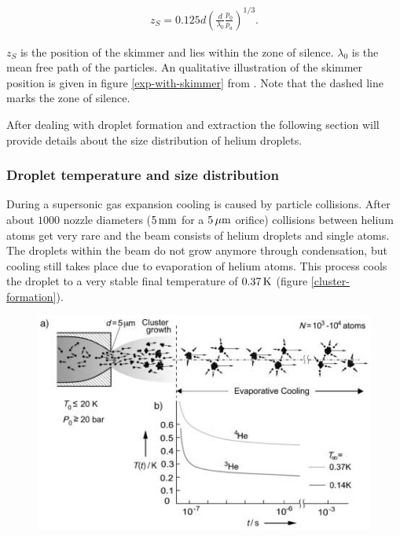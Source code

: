 \documentclass[parskip,12pt,headsepline,a4paper] {scrbook}
\begin{document}
\begin{align}  \label{skimmer-position}
z_S = 0.125d\left(\frac{d}{\lambda_0}\frac{p_0}{p_a}\right)^{1/3}.
\end{align}

$z_S$ is the position of the skimmer and lies within the zone of silence. $\lambda_0$ is the mean free path of the particles. An qualitative illustration of the skimmer position is given in figure \ref{exp-with-skimmer} from \cite{skimmer-pos}. Note that the dashed line marks the zone of silence.

After dealing with droplet formation and extraction the following section will provide details about the size distribution of helium droplets.


\subsubsection{Droplet temperature and size distribution}
\vspace{-1\baselineskip}
During a supersonic gas expansion cooling is caused by particle collisions. After about $1000$ nozzle diameters ($\unit[5]{mm}$ for a $\unit[5]{\mu m}$ orifice) collisions between helium atoms get very rare and the beam consists of helium droplets and single atoms. The droplets within the beam do not grow anymore through condensation, but cooling still takes place due to evaporation of helium atoms. This process cools the droplet to a very stable final temperature of $\unit[0.37]{K}$ (figure \ref{cluster-formation}).
\begin{figure}[ht]
\centerline{
\includegraphics[width=12cm]{./expansion/cluster-formation.jpg}}
\end{figure}\\
\end{document}
